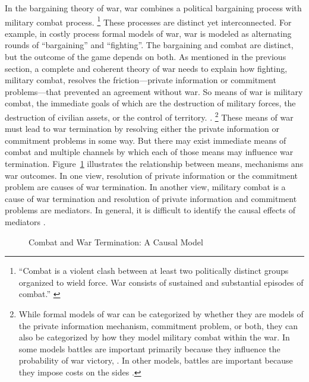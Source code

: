 In the bargaining theory of war, war combines a political bargaining process with military combat process. %
\footnote{%
  ``Combat is a violent clash between at least two politically
  distinct groups organized to wield force. War consists of sustained
  and substantial episodes of combat.'' \parencite{Reiter2003} %
} %
These processes are distinct yet interconnected.%
For example, in costly process formal models of war, war is modeled as alternating rounds of ``bargaining'' and ``fighting''. %
The bargaining and combat are distinct, but the outcome of the game depends on both.
As mentioned in the previous section, a complete and coherent theory of war needs to explain how fighting, \ie{}military combat, resolves the friction---private information or commitment problems---that prevented an agreement without war.
So means of war is military combat, the immediate goals of which are the destruction of military forces, the destruction of civilian assets, or the control of territory.
\parencite[30]{Reiter2003}.%
\footnote{
While formal models of war can be categorized by whether they are models of the private information mechanism, commitment problem, or both, they can also be categorized by how they model military combat within the war.
In some models battles are important primarily because they influence the probability of war victory, \parencites{Powell2004}{Wagner2000}{LeventogluSlantchev2007}{Slantchev2003}{SmithStam2004}.
In other models, battles are important because they impose costs on the sides \parencites{FilsonWerner2002}{Powell2004}{LeventogluSlantchev2007}. %
}
These means of war must lead to war termination by resolving either the private information or commitment problems in some way.
But there may exist immediate means of combat and multiple channels by which each of those means may influence war termination.
Figure~\ref{bonds:fig:combat-causal-diagram} illustrates the relationship between means, mechanisms ans war outcomes.
In one view, resolution of private information or the commitment problem are causes of war termination.
In another view, military combat is a cause of war termination and resolution of private information and commitment problems are mediators.
In general, it is difficult to identify the causal effects of mediators \parencite{Keele2015a}.

\begin{figure}[!htpb]
  \centering
  
  \caption{Combat and War Termination: A Causal Model}
  \label{bonds:fig:combat-causal-diagram}
\end{figure}

